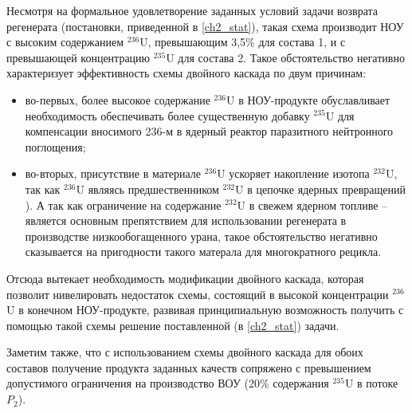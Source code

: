 Несмотря на формальное удовлетворение заданных условий задачи возврата регенерата (постановки, приведенной в \ref{ch2_stat}), такая схема производит НОУ с высоким содержанием $^{236}$U, превышающим 3,5\% для состава 1, и с превышающей концентрацию $^{235}$U для состава 2. Такое обстоятельство негативно характеризует эффективность схемы двойного каскада по двум причинам:
\begin{itemize}
  \item во-первых, более высокое содержание $^{236}$U в НОУ-продукте обуславливает необходимость обеспечивать более существенную добавку $^{235}$U для компенсации вносимого 236-м в ядерный реактор паразитного нейтронного поглощения;
  \item во-вторых, присутствие в материале $^{236}$U ускоряет накопление изотопа $^{232}$U, так как $^{236}$U являясь предшественником $^{232}$U в цепочке ядерных превращений \cite{smirnovEvolutionIsotopicComposition2012}). А так как ограничение на содержание $^{232}$U в свежем ядерном топливе -- является основным препятствием для использовании регенерата в производстве низкообогащенного урана, такое обстоятельство негативно сказывается на пригодности такого матерала для многократного рецикла.
\end{itemize}

Отсюда вытекает необходимость модификации двойного каскада, которая позволит нивелировать недостаток схемы, состоящий в высокой концентрации $^{236}$U в конечном НОУ-продукте, развивая принципиальную возможность получить с помощью такой схемы решение поставленной (в \ref{ch2_stat}) задачи. 

Заметим также, что с использованием схемы двойного каскада для обоих составов получение продукта заданных качеств сопряжено с превышением допустимого ограничения на производство ВОУ (20\% содержания $^{235}$U в потоке $P_{2}$).














\clearpage
